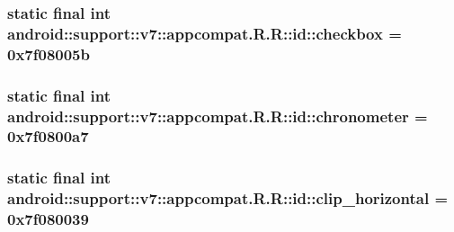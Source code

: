 \hypertarget{classandroid_1_1support_1_1v7_1_1appcompat_1_1_r_1_1id_5dde61d20ec507640aaae4390e561e98}{
\subsubsection[{checkbox}]{\setlength{\rightskip}{0pt plus 5cm}static final int android::support::v7::appcompat.R.R::id::checkbox = 0x7f08005b}}
\label{classandroid_1_1support_1_1v7_1_1appcompat_1_1_r_1_1id_5dde61d20ec507640aaae4390e561e98}


\hypertarget{classandroid_1_1support_1_1v7_1_1appcompat_1_1_r_1_1id_8c106c4cb93c83b2126e9c94f1d05f84}{
\subsubsection[{chronometer}]{\setlength{\rightskip}{0pt plus 5cm}static final int android::support::v7::appcompat.R.R::id::chronometer = 0x7f0800a7}}
\label{classandroid_1_1support_1_1v7_1_1appcompat_1_1_r_1_1id_8c106c4cb93c83b2126e9c94f1d05f84}


\hypertarget{classandroid_1_1support_1_1v7_1_1appcompat_1_1_r_1_1id_83a47d0042b8367334ce360a0f54a0d5}{
\subsubsection[{clip\_\-horizontal}]{\setlength{\rightskip}{0pt plus 5cm}static final int android::support::v7::appcompat.R.R::id::clip\_\-horizontal = 0x7f080039}}
\label{classandroid_1_1support_1_1v7_1_1appcompat_1_1_r_1_1id_83a47d0042b8367334ce360a0f54a0d5}



